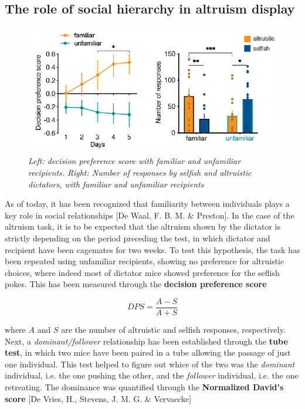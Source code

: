\documentclass[12pt, a4paper]{article}
\begin{document}
\subsection{The role of social hierarchy in altruism display}

\begin{figure}[H]
	\begin{center}
		\includegraphics[scale=0.6]{familiar.png} 
	\end{center} 
	\caption{\textit{Left: decision preference score with familiar and unfamiliar recipients. Right: Number of responses by selfish and altruistic dictators, with familiar and unfamiliar recipients}} \label{familiar}
	
\end{figure}

As of today, it has been recognized that familiarity between individuals plays a key role in social relationships [De Waal, F. B. M. \& Preston]. In the case of the altruism task, it is to be expected that the altruism shown by the dictator is strictly depending on the period preceding the test, in which dictator and recipient have been cagemates for two weeks. To test this hypothesis, the task has been repeated using unfamiliar recipients, showing no preference for altruistic choices, where indeed most of dictator mice showed preference for the seflish pokes. This has been measured through the \textbf{decision preference score} 

\begin{equation}
DPS = \frac{A -S}{A+S}
\end{equation}

where $A$ and $S$ are the number of altruistic and selfish responses, respectively.\\
Next, a \textit{dominant/follower} relationship has been established through the \textbf{tube test}, in which two mice have been paired in a tube allowing the passage of just one individual. This test helped to figure out whice of the two was the \textit{dominant} individual, i.e. the one pushing the other, and the \textit{follower} individual, i.e. the one retreating. The dominance was quantified through the \textbf{Normalized David's score} [De Vries, H., Stevens, J. M. G. \& Vervaecke]
\end{document}
